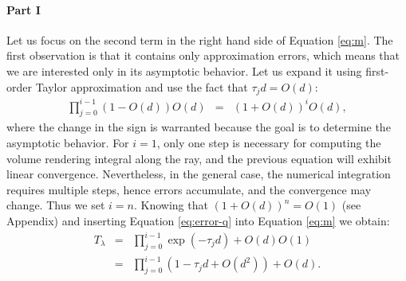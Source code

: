 \paragraph*{Part I}
Let us focus on the second term in the right hand side of Equation \eqref{eq:m}. The first observation is that it contains only approximation errors, which means that we are  interested only in its asymptotic behavior. Let us expand it using first-order Taylor approximation and use the fact that  $\tau_j d = O(d)$: 
\begin{eqnarray}
\prod_{j=0}^{i-1}\left(1-O(d)\right)O(d) &=& \left(1+O(d)\right)^iO(d), \label{eq:error-q}
\end{eqnarray}
%
where the change in the sign is warranted because the goal is to determine the asymptotic behavior. For $i = 1$, only one step is necessary for computing the volume rendering integral along the ray, and the previous equation will exhibit linear convergence.  Nevertheless, in the general case, the numerical integration requires multiple steps, hence errors accumulate, and the convergence may change. Thus  we set $i = n$. Knowing that $(1 + O(d) )^{n} = O(1)$ (see Appendix) and inserting Equation \eqref{eq:error-q} into Equation \eqref{eq:m} we obtain:
\begin{eqnarray}
T_\lambda
& = & \prod_{j=0}^{i-1}\exp(-\tau_j d)  + O(d)O(1)\\
& = & \prod_{j=0}^{i-1} \left(1 - \tau_jd + O(d^2)\right) + O(d).\label{eq:partial}
\end{eqnarray}

